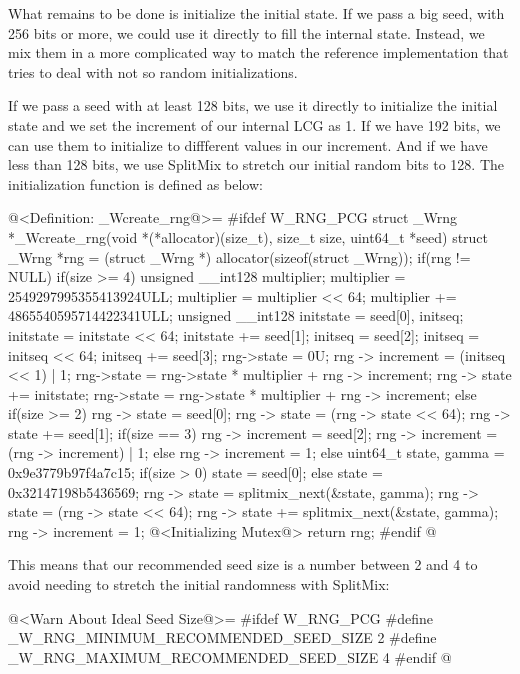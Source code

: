 What remains to be done is initialize the initial state. If we pass a
big seed, with 256 bits or more, we could use it directly to fill the
internal state. Instead, we mix them in a more complicated way to
match the reference implementation that tries to deal with not so
random initializations.

If we pass a seed with at least 128 bits, we use it directly to
initialize the initial state and we set the increment of our internal
LCG as 1. If we have 192 bits, we can use them to initialize to
diffferent values in our increment. And if we have less than 128 bits,
we use SplitMix to stretch our initial random bits to 128. The
initialization function is defined as below:

\iniciocodigo
@<Definition: \_Wcreate\_rng@>=
#ifdef W_RNG_PCG
struct _Wrng *_Wcreate_rng(void *(*allocator)(size_t), size_t size,
                           uint64_t *seed){
  struct _Wrng *rng = (struct _Wrng *) allocator(sizeof(struct _Wrng));
  if(rng != NULL){
    if(size >= 4){
      unsigned __int128 multiplier;
      multiplier = 2549297995355413924ULL;
      multiplier = multiplier << 64;
      multiplier += 4865540595714422341ULL;
      unsigned __int128 initstate = seed[0], initseq;
      initstate = initstate << 64;
      initstate += seed[1];
      initseq = seed[2];
      initseq = initseq << 64;
      initseq += seed[3];
      rng->state = 0U;
      rng -> increment = (initseq << 1) | 1;
      rng->state = rng->state * multiplier + rng -> increment;
      rng -> state += initstate;
      rng->state = rng->state * multiplier + rng -> increment;
    }
    else if(size >= 2){
      rng -> state = seed[0];
      rng -> state = (rng -> state << 64);
      rng -> state += seed[1];
      if(size == 3){
        rng -> increment = seed[2];
        rng -> increment = (rng -> increment) | 1;
      }
      else
        rng -> increment = 1;
    }
    else{
      uint64_t state, gamma = 0x9e3779b97f4a7c15;
      if(size > 0)
        state = seed[0];
      else
        state = 0x32147198b5436569;
      rng -> state = splitmix_next(&state, gamma);
      rng -> state = (rng -> state << 64);
      rng -> state += splitmix_next(&state, gamma);
      rng -> increment = 1;
    }                           
    @<Initializing Mutex@>
  }
  return rng;
}
#endif
@
\fimcodigo

This means that our recommended seed size is a number between 2 and 4
to avoid needing to stretch the initial randomness with SplitMix:

\iniciocodigo
@<Warn About Ideal Seed Size@>=
#ifdef W_RNG_PCG
#define _W_RNG_MINIMUM_RECOMMENDED_SEED_SIZE  2
#define _W_RNG_MAXIMUM_RECOMMENDED_SEED_SIZE  4
#endif
@
\fimcodigo


